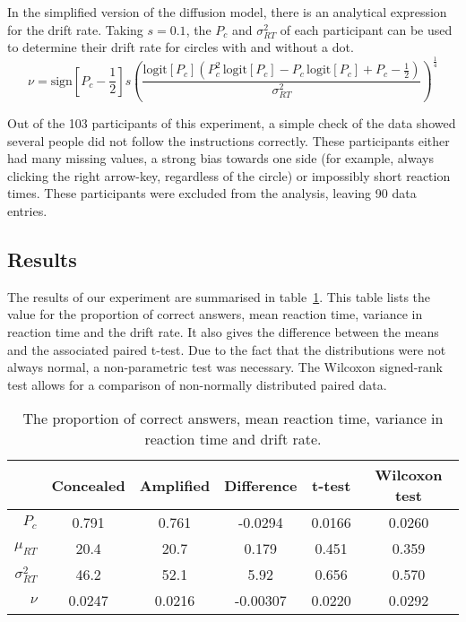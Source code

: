 \documentclass[a4paper,12pt]{article}
\numberwithin{equation}{section}
\begin{document}
In the simplified version of the diffusion model, there is an analytical expression for the drift rate. Taking $s = 0.1$, the $P_{c}$ and $\sigma_{RT}^{2}$ of each participant can be used to determine their drift rate for circles with and without a dot.
\begin{equation}
\label{eq:DriftRate}
\nu = \text{sign} \left[ P_{c} - \frac{1}{2} \right] s \left( \frac{\text{logit}[P_{c}] (P_{c}^{2} \, \text{logit}[P_{c}] - P_{c} \, \text{logit}[P_{c}] + P_{c} - \frac{1}{2})}{\sigma_{RT}^{2}} \right)^{\frac{1}{4}}
\end{equation}

Out of the 103 participants of this experiment, a simple check of the data showed several people did not follow the instructions correctly. These participants either had many missing values, a strong bias towards one side (for example, always clicking the right arrow-key, regardless of the circle) or impossibly short reaction times. These participants were excluded from the analysis, leaving 90 data entries.


\subsection{Results}
\label{sec:Results}

The results of our experiment are summarised in table~\ref{tab:ResultsExperiment}. This table lists the value for the proportion of correct answers, mean reaction time, variance in reaction time and the drift rate. It also gives the difference between the means and the associated paired t-test. Due to the fact that the distributions were not always normal, a non-parametric test was necessary. The Wilcoxon signed-rank test allows for a comparison of non-normally distributed paired data.

\vspace{4mm}

\begin{table}[h]
\begin{center}
\begin{tabular}{r|ccccc}
&Concealed&Amplified&Difference&t-test&Wilcoxon test\\
\hline
$P_{c}$&0.791&0.761&-0.0294&0.0166&0.0260\\
$\mu_{RT}$&20.4&20.7&0.179&0.451&0.359\\
$\sigma_{RT}^{2}$&46.2&52.1&5.92&0.656&0.570\\
$\nu$&0.0247&0.0216&-0.00307&0.0220&0.0292
\end{tabular}
\end{center}
\captionsetup{width=100mm}
\caption{The proportion of correct answers, mean reaction time, variance in reaction time and drift rate.}
\label{tab:ResultsExperiment}
\end{table}
\end{document}
